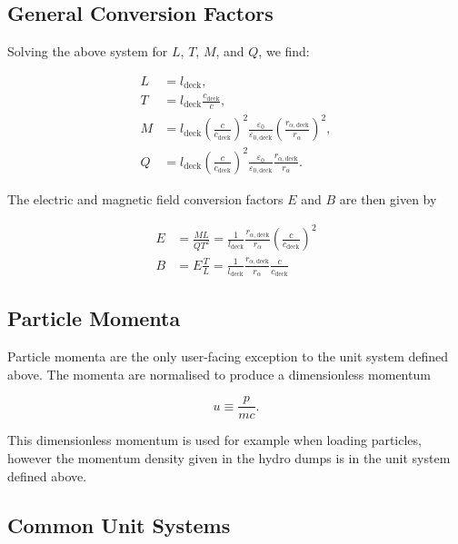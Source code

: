 \documentclass[twocolumn,10pt]{article}
\begin{document}
	\subsection{General Conversion Factors}

	Solving the above system for $L$, $T$, $M$, and $Q$, we find:

	\begin{align}
		L &= l_{\mathrm{deck}}, \\
		T &= l_{\mathrm{deck}}\frac{c_{\mathrm{deck}}}{c}, \\
		M &= l_{\mathrm{deck}}\left(\frac{c}{c_{\mathrm{deck}}}\right)^2\frac{\varepsilon_0}{\varepsilon_{0,\mathrm{deck}}}\left(\frac{r_{\alpha,\mathrm{deck}}}{r_{\alpha}}\right)^2, \\
		Q &= l_{\mathrm{deck}}\left(\frac{c}{c_{\mathrm{deck}}}\right)^2\frac{\varepsilon_0}{\varepsilon_{0,\mathrm{deck}}}\frac{r_{\alpha,\mathrm{deck}}}{r_{\alpha}}.
	\end{align}

	\noindent The electric and magnetic field conversion factors $E$ and $B$ are then given by

	\begin{align}
		E &= \frac{ML}{QT^2} = \frac{1}{l_{\mathrm{deck}}}\frac{r_{\alpha,\mathrm{deck}}}{r_{\alpha}}\left(\frac{c}{c_{\mathrm{deck}}}\right)^2 \\
		B &= E\frac{T}{L} = \frac{1}{l_{\mathrm{deck}}}\frac{r_{\alpha,\mathrm{deck}}}{r_{\alpha}}\frac{c}{c_{\mathrm{deck}}}
	\end{align}

	\subsection{Particle Momenta}

	Particle momenta are the only user-facing exception to the unit system defined above. The momenta are normalised to produce a dimensionless momentum

	\begin{equation}
		u \equiv \frac{p}{mc}.
	\end{equation}

	This dimensionless momentum is used for example when loading particles, however the momentum density given in the hydro dumps is in the unit system defined above.

	\subsection{Common Unit Systems}
\end{document}

